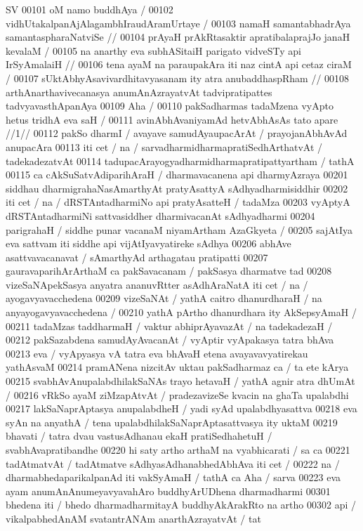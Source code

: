 SV
00101 oM namo buddhAya / 
00102 	vidhUtakalpanAjAlagambhIraudAramUrtaye /  
00103 	namaH samantabhadrAya samantaspharaNatviSe //
00104 	prAyaH prAkRtasaktir apratibalaprajJo janaH kevalaM / 
00105 	na anarthy eva subhASitaiH parigato vidveSTy api IrSyAmalaiH //
00106 	tena ayaM na paraupakAra iti naz cintA api cetaz ciraM /
00107 	sUktAbhyAsavivardhitavyasanam ity atra anubaddhaspRham //  
00108 arthAnarthavivecanasya anumAnAzrayatvAt tadvipratipattes tadvyavasthApanAya
00109 Aha /  
00110 	pakSadharmas tadaMzena vyApto hetus tridhA eva saH / 
00111 	avinAbhAvaniyamAd hetvAbhAsAs tato apare //1//
00112 pakSo dharmI / avayave samudAyaupacArAt / prayojanAbhAvAd anupacAra
00113 iti cet / na / sarvadharmidharmapratiSedhArthatvAt / tadekadezatvAt
00114 tadupacArayogyadharmidharmapratipattyartham / tathA
00115 ca cAkSuSatvAdiparihAraH / dharmavacanena api dharmyAzraya
00201 siddhau dharmigrahaNasAmarthyAt pratyAsattyA sAdhyadharmisiddhir
00202 iti cet / na / dRSTAntadharmiNo api pratyAsatteH / tadaMza
00203 vyAptyA dRSTAntadharmiNi sattvasiddher dharmivacanAt sAdhyadharmi
00204 parigrahaH / siddhe punar vacanaM niyamArtham AzaGkyeta /  
00205 sajAtIya eva sattvam iti siddhe api vijAtIyavyatireke sAdhya 
00206 abhAve asattvavacanavat / sAmarthyAd arthagatau pratipatti   
00207 gauravaparihArArthaM ca pakSavacanam / pakSasya dharmatve tad 
00208 vizeSaNApekSasya anyatra ananuvRtter asAdhAraNatA iti cet / na / ayogavyavacchedena
00209 vizeSaNAt / yathA caitro dhanurdharaH / na anyayogavyavacchedena /
00210 yathA pArtho dhanurdhara ity AkSepsyAmaH / 
00211 tadaMzas taddharmaH / vaktur abhiprAyavazAt / na tadekadezaH /
00212 pakSazabdena samudAyAvacanAt / vyAptir vyApakasya tatra bhAva
00213 eva / vyApyasya vA tatra eva bhAvaH etena avayavavyatirekau yathAsvaM
00214 pramANena nizcitAv uktau pakSadharmaz ca / ta ete kArya  
00215 svabhAvAnupalabdhilakSaNAs trayo hetavaH / yathA agnir atra dhUmAt /
00216 vRkSo ayaM ziMzapAtvAt / pradezavizeSe kvacin na ghaTa upalabdhi
00217 lakSaNaprAptasya anupalabdheH / yadi syAd upalabdhyasattva
00218 eva syAn na anyathA / tena upalabdhilakSaNaprAptasattvasya ity uktaM
00219 bhavati / tatra dvau vastusAdhanau ekaH pratiSedhahetuH /  svabhAvapratibandhe
00220 hi saty artho arthaM na vyabhicarati / sa ca
00221 tadAtmatvAt / tadAtmatve sAdhyasAdhanabhedAbhAva iti cet /
00222 na / dharmabhedaparikalpanAd iti vakSyAmaH / tathA ca Aha / sarva
00223 eva ayam anumAnAnumeyavyavahAro buddhyArUDhena dharmadharmi
00301 bhedena iti / bhedo dharmadharmitayA buddhyAkArakRto na  artho
00302 api / vikalpabhedAnAM svatantrANAm anarthAzrayatvAt / tat  

